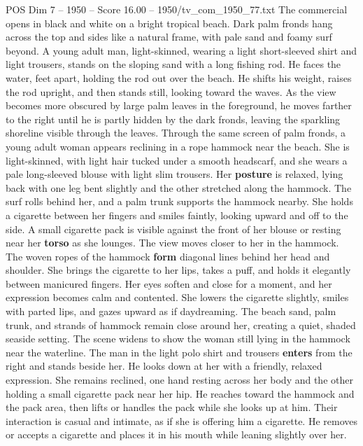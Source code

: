 \begin{textsample}{POS Dim 7 – 1950 – Score 16.00 – 1950/tv\_com\_1950\_77.txt}  \label{ex:f7_pos_012}
The commercial opens in black and white on a bright tropical beach.
Dark palm fronds hang across the top and sides like a natural frame, with pale sand and foamy surf beyond.
A young adult man, light-skinned, wearing a light short-sleeved shirt and light trousers, stands on the sloping sand with a long fishing rod.
He faces the water, feet apart, holding the rod out over the beach.
He shifts his weight, raises the rod upright, and then stands still, looking toward the waves.
As the view becomes more obscured by large palm leaves in the foreground, he moves farther to the right until he is partly hidden by the dark fronds, leaving the sparkling shoreline visible through the leaves.
Through the same screen of palm fronds, a young adult woman appears reclining in a rope hammock near the beach.
She is light-skinned, with light hair tucked under a smooth headscarf, and she wears a pale long-sleeved blouse with light slim trousers.
Her \textbf{posture} is relaxed, lying back with one leg bent slightly and the other stretched along the hammock.
The surf rolls behind her, and a palm trunk supports the hammock nearby.
She holds a cigarette between her fingers and smiles faintly, looking upward and off to the side.
A small cigarette pack is visible against the front of her blouse or resting near her \textbf{torso} as she lounges.
The view moves closer to her in the hammock.
The woven ropes of the hammock \textbf{form} diagonal lines behind her head and shoulder.
She brings the cigarette to her lips, takes a puff, and holds it elegantly between manicured fingers.
Her eyes soften and close for a moment, and her expression becomes calm and contented.
She lowers the cigarette slightly, smiles with parted lips, and gazes upward as if daydreaming.
The beach sand, palm trunk, and strands of hammock remain close around her, creating a quiet, shaded seaside setting.
The scene widens to show the woman still lying in the hammock near the waterline.
The man in the light polo shirt and trousers \textbf{enters} from the right and stands beside her.
He looks down at her with a friendly, relaxed expression.
She remains reclined, one hand resting across her body and the other holding a small cigarette pack near her hip.
He reaches toward the hammock and the pack area, then lifts or handles the pack while she looks up at him.
Their interaction is casual and intimate, as if she is offering him a cigarette.
He removes or accepts a cigarette and places it in his mouth while leaning slightly over her.

\end{textsample}
